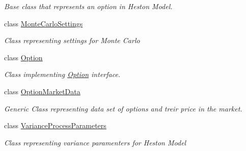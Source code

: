 \begin{DoxyCompactItemize}
\begin{DoxyCompactList}\small\item\em Base class that represents an option in Heston Model. \end{DoxyCompactList}\item 
class \mbox{\hyperlink{class_heston_model_1_1_classes_1_1_interface_classes_1_1_monte_carlo_settings}{Monte\+Carlo\+Settings}}
\begin{DoxyCompactList}\small\item\em Class representing settings for Monte Carlo \end{DoxyCompactList}\item 
class \mbox{\hyperlink{class_heston_model_1_1_classes_1_1_interface_classes_1_1_option}{Option}}
\begin{DoxyCompactList}\small\item\em Class implementing \mbox{\hyperlink{class_heston_model_1_1_classes_1_1_interface_classes_1_1_option}{Option}} interface. \end{DoxyCompactList}\item 
class \mbox{\hyperlink{class_heston_model_1_1_classes_1_1_interface_classes_1_1_option_market_data}{Option\+Market\+Data}}
\begin{DoxyCompactList}\small\item\em Generic Class representing data set of options and treir price in the market. \end{DoxyCompactList}\item 
class \mbox{\hyperlink{class_heston_model_1_1_classes_1_1_interface_classes_1_1_variance_process_parameters}{Variance\+Process\+Parameters}}
\begin{DoxyCompactList}\small\item\em Class representing variance paramenters for Heston Model \end{DoxyCompactList}\end{DoxyCompactItemize}
